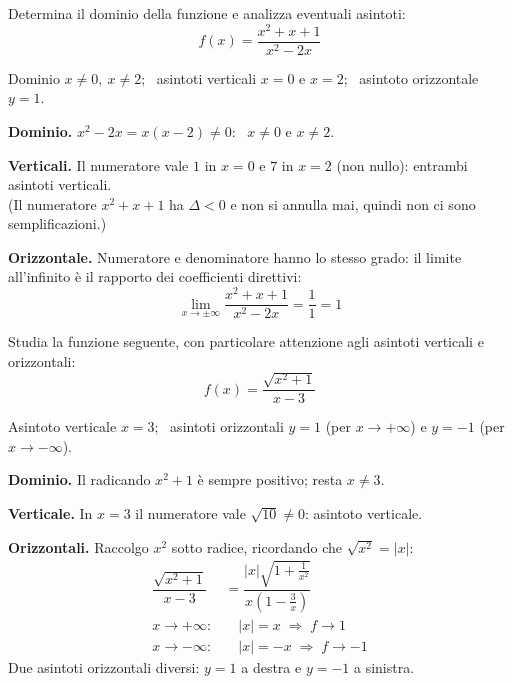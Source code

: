 
\begin{question}[ID=5.5, subtitle={Asintoti di $f(x)=(x^2+x+1)/(x^2-2x)$}, tags={continuità, asintoti}, difficulty=media]
Determina il dominio della funzione e analizza eventuali asintoti:
\begin{equation*}
    f(x) = \frac{x^2 + x + 1}{x^2 - 2x}
\end{equation*}
\begin{solution}
Dominio $x\neq0,\ x\neq2$; \ asintoti verticali $x=0$ e $x=2$; \ asintoto orizzontale $y=1$.
\end{solution}
\begin{explanation}
\textbf{Dominio.} $x^2-2x=x(x-2)\neq0$: \ $x\neq0$ e $x\neq2$.

\textbf{Verticali.} Il numeratore vale $1$ in $x=0$ e $7$ in $x=2$ (non nullo): entrambi asintoti verticali. \\
(Il numeratore $x^2+x+1$ ha $\Delta<0$ e non si annulla mai, quindi non ci sono semplificazioni.)

\textbf{Orizzontale.} Numeratore e denominatore hanno lo stesso grado: il limite all'infinito è il rapporto dei coefficienti direttivi:
\[ \lim_{x\to\pm\infty}\dfrac{x^2+x+1}{x^2-2x}=\dfrac11=1 \]
\end{explanation}
\end{question}


\begin{question}[ID=5.6, subtitle={Asintoti di $f(x)=\sqrt{x^2+1}/(x-3)$}, tags={continuità, asintoti}, difficulty=media]
Studia la funzione seguente, con particolare attenzione agli asintoti verticali e orizzontali:
\begin{equation*}
    f(x) = \frac{\sqrt{x^2+1}}{x-3}
\end{equation*}
\begin{solution}
Asintoto verticale $x=3$; \ asintoti orizzontali $y=1$ (per $x\to+\infty$) e $y=-1$ (per $x\to-\infty$).
\end{solution}
\begin{explanation}
\textbf{Dominio.} Il radicando $x^2+1$ è sempre positivo; resta $x\neq3$.

\textbf{Verticale.} In $x=3$ il numeratore vale $\sqrt{10}\neq0$: asintoto verticale.

\textbf{Orizzontali.} Raccolgo $x^2$ sotto radice, ricordando che $\sqrt{x^2}=|x|$:
\[\begin{aligned}
\dfrac{\sqrt{x^2+1}}{x-3} &= \dfrac{|x|\sqrt{1+\frac1{x^2}}}{x\left(1-\frac3x\right)}\\
x\to+\infty: &\quad |x|=x \;\Rightarrow\; f\to1\\
x\to-\infty: &\quad |x|=-x \;\Rightarrow\; f\to-1
\end{aligned}\]
Due asintoti orizzontali diversi: $y=1$ a destra e $y=-1$ a sinistra.
\end{explanation}
\end{question}
